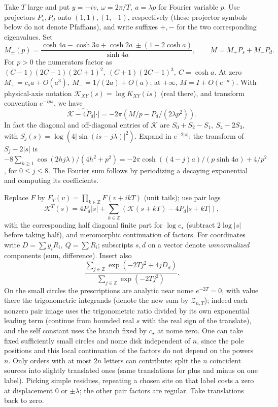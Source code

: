 Take \(T\) large and put \(y=-iv,\ \omega=2\pi/T,\ a=\lambda p\) for Fourier variable \(p\). Use projectors \(P_s,P_d\) onto \((1,1),(1,-1)\), respectively (these projector symbols below do not denote Pfaffians), and write suffixes \(+,-\) for the two corresponding eigenvalues. Set
\[
 M_\pm(p)=\frac{\cosh4a-\cosh3a+\cosh2a\ \pm(1-2\cosh a)}{\sinh4a},
 \qquad M=M_+P_s+M_-P_d .
\]
For \(p>0\) the numerators factor as
\((C-1)(2C-1)(2C+1)^2,\ (C+1)(2C-1)^3,\ C=\cosh a\). At zero \(M_+=c_s a+O(a^3),\ M_-=1/(2a)+O(a)\); at \(+\infty\), \(M=I+O(e^{-a})\).
With physical-axis notation \(\mathcal K_{XY}(s)=\log K_{XY}(is)\) (real there), and transform convention \(e^{-ips}\), we have
\[
 \widehat{\mathcal K-4P_d|\cdot|}=-2\pi\left(M/p-P_d/(2\lambda p^2)\right).
\]
In fact the diagonal and off-diagonal entries of \(\mathcal K\) are \(S_0+S_2-S_1,\ S_4-2S_3\), with \(S_j(s)=\log(4|\sin(is-j\lambda)|^2)\). Expand in \(e^{-2|s|}\): the transform of \(S_j-2|s|\) is \(-8\sum_{h\ge1}\cos(2hj\lambda)/(4h^2+p^2)=-2\pi\cosh((4-j)a)/(p\sinh4a)+4/p^2\), for \(0\le j\le8\). The Fourier sum follows by periodizing a decaying exponential and computing its coefficients.

Replace \(F\) by \(F_T(v)=\prod_{k\in\mathbb Z}F(v+ikT)\) (unit tails); use pair logs
\[
 \mathcal K^T(s)=4P_d|s|+\sum_{k\in\mathbb Z}\left(\mathcal K(s+kT)-4P_d|s+kT|\right),
\]
with the corresponding half diagonal finite part for \(\log c_\star\) (subtract \(2\log|s|\) before taking half), and meromorphic continuation of factors. For coordinates write \(D=\sum y_i R_i,\ Q=\sum R_i\); subscripts \(s,d\) on a vector denote \emph{unnormalized} components (sum, difference). Insert also
\[
 \frac{\sum_{j\in\mathbb Z}\exp(-2Tj^2+4j D_d)}
 {\sum_{j\in\mathbb Z}\exp(-2Tj^2)} .
\]
On the small circles the prescriptions are analytic near nome \(e^{-2T}=0\), with value there the trigonometric integrands (denote the new sum by \(\mathcal Z_{n,T}\)); indeed each nonzero pair image uses the trigonometric ratio divided by its own exponential leading term (continue from bounded real \(s\) with the real sign of the translate), and the self constant uses the branch fixed by \(c_\star\) at nome zero. One can take fixed sufficiently small circles and nome disk independent of \(n\), since the pole positions and this local continuation of the factors do not depend on the powers \(n\). Only orders with at most \(2n\) letters can contribute: split the \(n\) coincident sources into slightly translated ones (same translations for plus and minus on one label). Picking simple residues, repeating a chosen site on that label costs a zero at displacement 0 or \(\pm\lambda\); the other pair factors are regular. Take translations back to zero.


